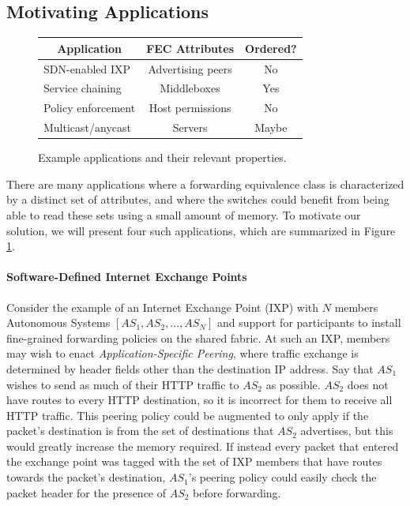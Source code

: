 \subsection{Motivating Applications}
\begin{figure}
\small
\begin{center}
    \begin{tabular}{|l|c|c|}
    \hline
    \multicolumn{1}{|c|}{\bf Application} & 
    \multicolumn{1}{c|}{\bf FEC Attributes} & 
    \multicolumn{1}{c|}{\bf Ordered?}\\ \hline
    SDN-enabled IXP & Advertising peers & No \\ \hline
    Service chaining & Middleboxes & Yes \\ \hline
    Policy enforcement & Host permissions & No \\ \hline
    Multicast/anycast & Servers & Maybe \\ \hline
    \end{tabular}
\end{center}
    \caption{Example applications and their relevant properties. } 
    \label{tab:applications}
\end{figure}

There are many applications where a forwarding equivalence class is characterized by a distinct set of attributes, and where the switches could benefit from being able to read these sets using a small amount of memory. To motivate our solution, we will present four such applications, which are summarized in Figure \ref{tab:applications}.
 
\paragraph{Software-Defined Internet Exchange Points}
Consider the example of an Internet Exchange Point (IXP) with $N$ members Autonomous Systems $[AS_1, AS_2, ..., AS_N]$ and support for participants to install fine-grained forwarding policies on the shared fabric. At such an IXP, members may wish to enact \textit{Application-Specific Peering}, where traffic exchange is determined by header fields other than the destination IP address. Say that $AS_1$ wishes to send as much of their HTTP traffic to $AS_2$ as possible. $AS_2$ does not have routes to every HTTP destination, so it is incorrect for them to receive all HTTP traffic. This peering policy could be augmented to only apply if the packet's destination is from the set of destinations that $AS_2$ advertises, but this would greatly increase the memory required. If instead every packet that entered the exchange point was tagged with the set of IXP members that have routes towards the packet's destination, $AS_1$'s peering policy could easily check the packet header for the presence of $AS_2$ before forwarding.


